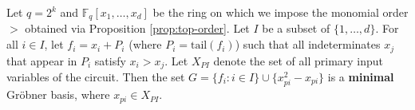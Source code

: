 



\begin{Corollary}
\label{thm:mini}
Let $q = 2^k$ and $\mathbb{F}_q[x_1, \ldots, x_d]$ be the ring on
which we impose the monomial order $>$ obtained via Proposition
\ref{prop:top-order}. Let $I$ be a subset of $\{1, \ldots, d\}$. For
all $i \in I$, let $f_i = x_i +P_i$ (where $P_i = \text{tail}(f_i)$) such
that  all indeterminates $x_j$  that appear in $P_i$ satisfy $x_i >
x_j$.  Let $X_{PI}$ denote the set of all primary input variables of
the circuit. Then the set $G =\{f_i :  i  \in I\} \cup \{x_{pi}^2-x_{pi}\}$ 
is a {\bf minimal} Gr\"obner basis, where $x_{pi} \in X_{PI}$.  
\end{Corollary}

